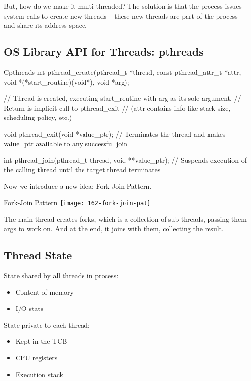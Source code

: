 \documentclass[openany]{book}
\begin{document}
But, how do we make it multi-threaded? The solution is that the process issues system calls to create new threads -- these new threads are part of the process and share its address space.

\subsection{OS Library API for Threads: pthreads}
\begin{code}{C}{pthreads}
int pthread_create(pthread_t *thread, const pthread_attr_t *attr, void *(*start_routine)(void*), void *arg);

// Thread is created, executing start_routine with arg as its sole argument.
// Return is implicit call to pthread_exit
// (attr contains info like stack size, scheduling policy, etc.)


void pthread_exit(void *value_ptr);
// Terminates the thread and makes value_ptr available to any successful join

int pthread_join(pthread_t thread, void **value_ptr);
// Suspends execution of the calling thread until the target thread terminates
\end{code}

Now we introduce a new idea: Fork-Join Pattern.
\begin{figurebox}[]{Fork-Join Pattern}
	\centering\texttt{[image: 162-fork-join-pat]}
\end{figurebox}

The main thread creates forks, which is a collection of sub-threads, passing them args to work on. And at the end, it joins with them, collecting the result.

\subsection{Thread State}
State shared by all threads in process:
\begin{itemize}
	\item Content of memory
	\item I/O state
\end{itemize}

State private to each thread:
\begin{itemize}
	\item Kept in the TCB
	\item CPU registers
	\item Execution stack
\end{itemize}
\end{document}
